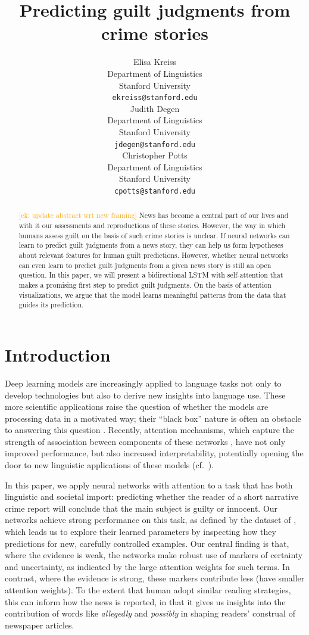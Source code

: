 \documentclass[11pt,a4paper]{article}
\title{Predicting guilt judgments from crime stories}
\author{Elisa Kreiss \\
  Department of Linguistics \\
  Stanford University \\
  \texttt{ekreiss@stanford.edu} \\\And
  Judith Degen \\
  Department of Linguistics \\
  Stanford University \\
  \texttt{jdegen@stanford.edu} \\\And
  Christopher Potts \\
  Department of Linguistics \\
  Stanford University \\
  \texttt{cpotts@stanford.edu}\\}
\date{}
\newcommand{\ek}[1]{\textcolor{Orange}{[ek: #1]}}
\begin{document}
\maketitle
\begin{abstract}
  \ek{update abstract wrt new framing}
  News has become a central part of our lives and with it our assessments and reproductions of these stories. However, the way in which humans assess guilt on the basis of such crime stories is unclear. If neural networks can learn to predict guilt judgments from a news story, they can help us form hypotheses about relevant features for human guilt predictions. However, whether neural networks can even learn to predict guilt judgments from a given news story is still an open question. In this paper, we will present a bidirectional LSTM with self-attention that makes a promising first step to predict guilt judgments. On the basis of attention visualizations, we argue that the model learns meaningful patterns from the data that guides its prediction.
\end{abstract}

\section{Introduction}


Deep learning models are increasingly applied to language tasks not only to develop technologies but also to derive new insights into language use. These more scientific applications raise the question of whether the models are processing data in a motivated way; their ``black box'' nature is often an obstacle to answering this question \citep{Alishah-etal:2019}. Recently, attention mechanisms, which capture the strength of association beween components of these networks \citep{bahdanau2014neural,luong-etal-2015-effective}, have not only improved performance, but also increased interpretability, potentially opening the door to new linguistic applications of these models (cf.~\citep{papers-that-challenge-this-idea}).

In this paper, we apply neural networks with attention to a task that has both linguistic and societal import: predicting whether the reader of a short narrative crime report will conclude that the main subject is guilty or innocent. Our networks achieve strong performance on this task, as defined by the dataset of \citet{Kreiss:2019}, which leads us to explore their learned parameters by inspecting how they predictions for new, carefully controlled examples. Our central finding is that, where the evidence is weak, the networks make robust use of markers of certainty and uncertainty, as indicated by the large attention weights for such terms. In contrast, where the evidence is strong, these markers contribute less (have smaller attention weights). To the extent that human adopt similar reading strategies, this can inform how the news is reported, in that it gives us insights into the contribution of words like \emph{allegedly} and \emph{possibly} in shaping readers' construal of newspaper articles.
\end{document}

